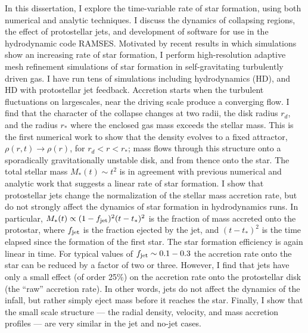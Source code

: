 \documentclass[12pt,notitlepage]{report}
\begin{document}
In this dissertation, I explore the time-variable rate of star formation, using both numerical and analytic techniques. 
I discuss the dynamics of collapsing regions, the effect of protostellar jets, and development of software for use in the hydrodynamic code RAMSES.
Motivated by recent results in which simulations show an increasing rate of star formation, I perform high-resolution adaptive mesh refinement simulations of star formation in self-gravitating turbulently driven gas. 
I have run tens of simulations including hydrodynamics (HD), and HD with protostellar jet feedback.
Accretion starts when the turbulent fluctuations on largescales, near the driving scale produce a converging flow.
I find that the character of the collapse changes at two radii, the disk radius $r_d$, and the radius $r_*$ where the enclosed gas mass exceeds the stellar mass. 
This is the first numerical work to show that the density evolves to a fixed attractor, $\rho(r,t ) \rightarrow \rho(r)$, for $r_d<r<r_*$; mass flows through this structure onto a sporadically gravitationally unstable disk, and from thence onto the star. 
The total stellar mass $M_*(t)\sim t^2$ is in agreement with previous numerical and analytic work that suggests a linear rate of star formation.
I show that protostellar jets change the normalization of the stellar mass accretion rate, 
but do not strongly affect the dynamics of star formation in hydrodynamics runs. 
In particular, $M_*(t) \propto (1 - f_{\rm jet})^2 (t-t_*)^2$ is the fraction of mass accreted onto the protostar, 
where $f_{\rm jet}$ is the fraction ejected by the jet, and $(t-t_*)^2$ is the time elapsed since the formation of the first star.
The star formation efficiency is again linear in time.
For typical values of $f_{\rm jet} \sim 0.1 - 0.3$ the accretion rate onto the star can be reduced by a factor of two or three. 
However, I find that jets have only a small effect (of order 25\%) on the accretion rate onto the protostellar disk (the ``raw'' accretion rate). 
In other words, jets do not affect the dynamics of the infall, but rather simply eject mass before it reaches the star.
Finally, I show that the small scale structure --- the radial density, velocity, and mass accretion profiles --- are very similar in the jet and no-jet cases.

\endabstract 
\newpage
\end{document}
